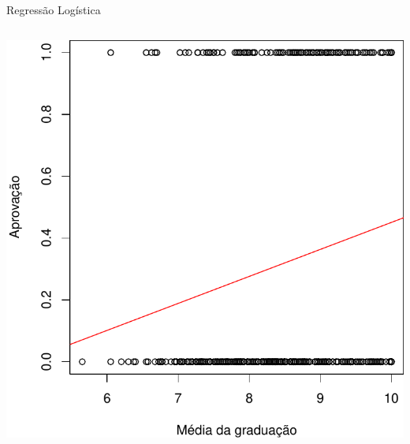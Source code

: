 \documentclass{beamer}\usepackage[]{graphicx}\usepackage[]{color}
\newenvironment{knitrout}{}{} %
\renewenvironment{knitrout}{\setlength{\topsep}{0mm}}{}
\begin{document}
\begin{frame}[fragile]{Regressão Logística}
\begin{columns}
\begin{knitrout}
\includegraphics[width=0.6\linewidth]{figure/logplot1-2} 

\end{knitrout}

\end{columns}

\end{frame}
\end{document}
